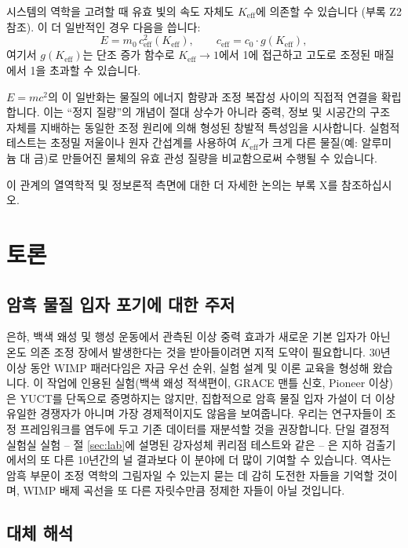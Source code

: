 \documentclass[11pt,a4paper]{article}
\begin{document}
	시스템의 역학을 고려할 때 유효 빛의 속도 자체도 $K_{\mathrm{eff}}$에 의존할 수 있습니다 (부록 Z2 참조). 이 더 일반적인 경우 다음을 씁니다:
	\[
	E = m_{0} \, c_{\mathrm{eff}}^{2}(K_{\mathrm{eff}}),\qquad
	c_{\mathrm{eff}} = c_{0} \cdot g(K_{\mathrm{eff}}),
	\]
	여기서 $g(K_{\mathrm{eff}})$는 단조 증가 함수로 $K_{\mathrm{eff}} \to 1$에서 1에 접근하고 고도로 조정된 매질에서 1을 초과할 수 있습니다.
	
	$E = mc^{2}$의 이 일반화는 물질의 에너지 함량과 조정 복잡성 사이의 직접적 연결을 확립합니다. 이는 ``정지 질량''의 개념이 절대 상수가 아니라 중력, 정보 및 시공간의 구조 자체를 지배하는 동일한 조정 원리에 의해 형성된 창발적 특성임을 시사합니다. 실험적 테스트는 초정밀 저울이나 원자 간섭계를 사용하여 $K_{\mathrm{eff}}$가 크게 다른 물질(예: 알루미늄 대 금)로 만들어진 물체의 유효 관성 질량을 비교함으로써 수행될 수 있습니다.
	
	이 관계의 열역학적 및 정보론적 측면에 대한 더 자세한 논의는 부록 X를 참조하십시오.
	
	\section{토론}
	\label{sec:discussion}
	
	\subsection{암흑 물질 입자 포기에 대한 주저}
	\label{subsec:on-reluctance}
	
	은하, 백색 왜성 및 행성 운동에서 관측된 이상 중력 효과가 새로운 기본 입자가 아닌 온도 의존 조정 장에서 발생한다는 것을 받아들이려면 지적 도약이 필요합니다. 30년 이상 동안 WIMP 패러다임은 자금 우선 순위, 실험 설계 및 이론 교육을 형성해 왔습니다. 이 작업에 인용된 실험(백색 왜성 적색편이, GRACE 맨틀 신호, Pioneer 이상)은 YUCT를 단독으로 증명하지는 않지만, 집합적으로 암흑 물질 입자 가설이 더 이상 유일한 경쟁자가 아니며 가장 경제적이지도 않음을 보여줍니다. 우리는 연구자들이 조정 프레임워크를 염두에 두고 기존 데이터를 재분석할 것을 권장합니다. 단일 결정적 실험실 실험 – 절 \ref{sec:lab}에 설명된 강자성체 퀴리점 테스트와 같은 – 은 지하 검출기에서의 또 다른 10년간의 널 결과보다 이 분야에 더 많이 기여할 수 있습니다. 역사는 암흑 부문이 조정 역학의 그림자일 수 있는지 묻는 데 감히 도전한 자들을 기억할 것이며, WIMP 배제 곡선을 또 다른 자릿수만큼 정제한 자들이 아닐 것입니다.
	
	\subsection{대체 해석}
	\label{subsec:discussion-alternatives}
	
\end{document}
